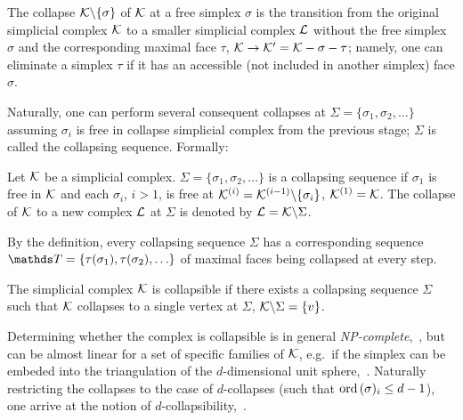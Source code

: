  The \gls{collapse} \( \mathcal{K} \backslash \{ \sigma \} \) of \( \mathcal{K} \) at a free simplex \( \sigma \) is the transition from the original simplicial complex \( \mathcal{K} \) to a smaller simplicial complex \( \mathcal{L} \) without the free simplex \( \sigma \) and the corresponding maximal face \( \tau \), \( \mathcal{K} \to \mathcal{K}' = \mathcal{K} - \sigma - \tau \); namely, one can eliminate a simplex \( \tau \) if it has an accessible (not included in another simplex) face \(\sigma\).

Naturally, one can perform several consequent collapses at  \( \Sigma = \{ \sigma_1, \sigma_2, \ldots \} \) assuming \( \sigma_i \) is free in collapse simplicial complex from the previous stage; \( \Sigma \) is called the \gls{collapsing sequence}. Formally:
 \begin{definition}
       Let \( \mathcal{K} \) be a simplicial complex. \( \Sigma = \{ \sigma_1, \sigma_2, \ldots \} \) is a \gls{collapsing sequence} if \( \sigma_1 \) is free in \( \mathcal{K} \) and each \( \sigma_i \), \( i > 1 \), is free at 
       \( \mathcal{K}^{(i)} = \mathcal{K}^{(i-1)} \backslash \{ \sigma_i \} \), \( \mathcal{K}^{(1)} = \mathcal{K} \). The collapse of \( \mathcal{K} \) to a new complex \( \mathcal{L} \) at \( \Sigma \) is denoted by \( \mathcal{L} = \mathcal{K} \backslash \Sigma \).
 \end{definition}
 By the definition, every collapsing sequence \( \Sigma \) has a corresponding sequence \( \ds T = \{ \tau(\sigma_1), \tau(\sigma_2), \ldots \} \) of maximal faces being collapsed at every step.

 \begin{definition}
      The simplicial complex \( \mathcal{K} \) is \gls{collapsible} if there exists a collapsing sequence \( \Sigma \) such that \( \mathcal{K} \) collapses to a single vertex at \( \Sigma \), \( \mathcal{K} \backslash \Sigma = \{ v \} \).
\end{definition}

Determining whether the complex is collapsible is in general \emph{NP-complete},~\cite{tancerRecognitionCollapsibleComplexes2016}, but can be almost linear for a set of specific families of \( \mathcal{K} \), e.g.\ if the simplex can be embeded into the triangulation of the \(d\)-dimensional unit sphere,~\cite{cohenSolving1laplaciansNearly2014}. Naturally restricting the collapses to the case of \(d\)-collapses (such that \( \mathrm{ord}\,(\sigma)_i \le d-1 \)), one arrive at the notion of \(d\)-collapsibility,~\cite{tancerDcollapsibilityNPcomplete2009}.

